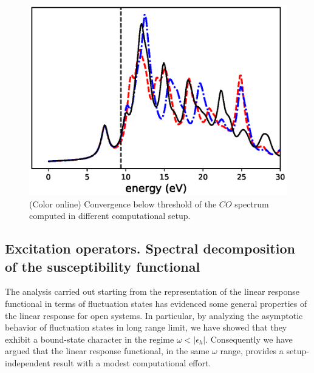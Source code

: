 \documentclass[reprint,aps,prb]{revtex4-1}
\newcommand{\eps}{\epsilon}
\begin{document}

\begin{figure}
\includegraphics[scale=0.56]{co_spectrum.eps}
\caption{\label{fig1}(Color online) Convergence below threshold of the $CO$ spectrum computed in different computational setup.}
\end{figure}


\subsection{Excitation operators. Spectral decomposition of the susceptibility functional}

The analysis carried out starting from the representation of the linear response functional in terms of fluctuation states has evidenced some general properties of the linear response
for open systems. In particular, by analyzing the asymptotic behavior of fluctuation states in long range limit, we have showed that they exhibit a bound-state character in the regime  
$\omega<|\eps_h|$. Consequently we have argued that the linear response functional, in the same $\omega$ range, provides a setup-independent result with a modest computational effort. 
\end{document}
